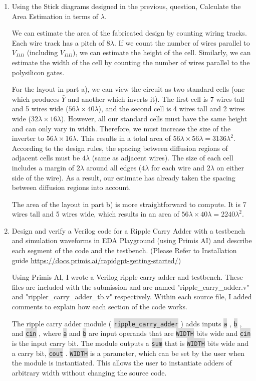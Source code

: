 \documentclass[fleqn]{article}
\newcommand{\code}[1]{%
	\colorbox{Gainsboro}{\texttt{#1}}%
}
\begin{document}
\begin{enumerate}
		\item Using the Stick diagrams designed in the previous, question, Calculate the Area Estimation in terms of $\lambda$.
			
		We can estimate the area of the fabricated design by counting wiring tracks. Each wire track has a pitch of $8\lambda$. If we count the number of wires parallel to $V_{DD}$ (including $V_{DD}$), we can estimate the height of the cell. Similarly, we can estimate the width of the cell by counting the number of wires parallel to the polysilicon gates.
		
		For the layout in part a), we can view the circuit as two standard cells (one which produces $\bar{Y}$ and another which inverts it). The first cell is 7 wires tall and 5 wires wide ($56 \lambda \times 40 \lambda$), and the second cell is 4 wires tall and 2 wires wide ($32 \lambda \times 16 \lambda$). However, all our standard cells must have the same height and can only vary in width. Therefore, we must increase the size of the inverter to $56 \lambda \times 16 \lambda$. This results in a total area of $56 \lambda \times 56 \lambda = 3136 \lambda^2$. According to the design rules, the spacing between diffusion regions of adjacent cells must be $4\lambda$ (same as adjacent wires). The size of each cell includes a margin of $2\lambda$ around all edges ($4\lambda$ for each wire and $2\lambda$ on either side of the wire). As a result, our estimate has already taken the spacing between diffusion regions into account.
		
		The area of the layout in part b) is more straightforward to compute. It is 7 wires tall and 5 wires wide, which results in an area of $56 \lambda \times 40 \lambda = 2240\lambda^2$.
		 
		 \item Design and verify a Verilog code for a Ripple Carry Adder with a testbench and simulation waveforms in EDA Playground (using Primis AI) and describe each segment of the code and the testbench. (Please Refer to Installation guide \url{https://docs.primis.ai/rapidgpt-getting-started/})
		 
		 \pagebreak
		 
		 Using Primis AI, I wrote a Verilog ripple carry adder and testbench. These files are included with the submission and are named "ripple\_carry\_adder.v" and "rippler\_carry\_adder\_tb.v" respectively. Within each source file, I added comments to explain how each section of the code works.
		 
		 The ripple carry adder module (\code{ripple\_carry\_adder}) adds inputs \code{a}, \code{b}, and \code{cin}, where \code{a} and \code{b} are input operands that are \code{WIDTH} bits wide and \code{cin} is the input carry bit. The module outputs a \code{sum} that is \code{WIDTH} bits wide and a carry bit, \code{cout}. \code{WIDTH} is a parameter, which can be set by the user when the module is instantiated. This allows the user to instantiate adders of arbitrary width without changing the source code.
		 

\end{enumerate}
\end{document}
